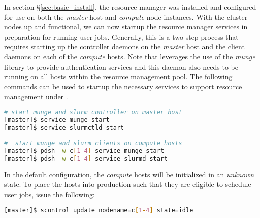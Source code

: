 In section \S\ref{sec:basic_install}, the \SLURM{} resource manager was installed
and configured for use on both the {\em master} host and {\em compute} node
instances. With the cluster nodes up and functional, we can now startup the
resource manager services in preparation for running user jobs. Generally, this
is a two-step process that requires starting up the controller daemons on the {\em
  master} host and the client daemons on each of the {\em compute} hosts.  
Note that \SLURM{} leverages the use of the {\em munge} library to provide
authentication services and this daemon also needs to be running on all hosts
within the resource management pool. 
The following commands can be used to startup the necessary services to support
resource management under \SLURM{}.

\vspace*{0.3cm}

\begin{lstlisting}[language=bash]
# start munge and slurm controller on master host
[master]$ service munge start
[master]$ service slurmctld start

#  start munge and slurm clients on compute hosts
[master]$ pdsh -w c[1-4] service munge start
[master]$ pdsh -w c[1-4] service slurmd start
\end{lstlisting}

In the default configuration, the {\em compute} hosts will be initialized in an
{\em unknown} state. To place the hosts into production such that they are
eligible to schedule user jobs, issue the following:

\begin{lstlisting}[language=bash]
[master]$ scontrol update nodename=c[1-4] state=idle
\end{lstlisting}



